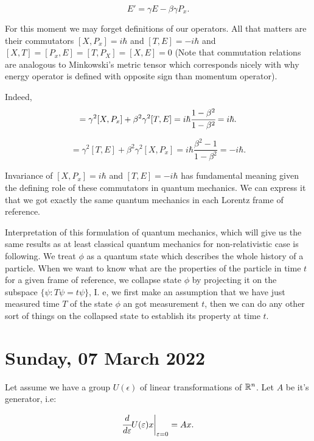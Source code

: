 \documentclass[main.tex]{subfiles}
\begin{document}
\begin{equation}
E' = \gamma E - \beta\gamma P_x.
\end{equation}

For this moment we may forget definitions of our operators. All that matters are their commutators $[X, P_x] = i\hbar$ and $[T, E] = -i\hbar$ and $[X, T] = [P_x, E] = [T, P_X] = [X, E] = 0$ (Note that commutation relations are analogous to Minkowski's metric tensor which corresponds nicely with why energy operator is defined with opposite sign than momentum operator).

Indeed,
\begin{equation}
[X', P'_x] = \gamma^2 [X, P_x] + \beta^2\gamma^2[T, E] = i\hbar\cfrac{1 - \beta^2}{1 - \beta^2} = i\hbar.
\end{equation}

\begin{equation}
[T', E'] = \gamma^2 [T, E] + \beta^2\gamma^2[X, P_x] = i\hbar \frac{\beta^2 - 1}{1 - \beta^2} = -i\hbar.
\end{equation}

Invariance of $[X, P_x] = i\hbar$ and $[T, E] = -i\hbar$ has fundamental meaning given the defining role of these commutators in quantum mechanics. We can express it that we got exactly the same quantum mechanics in each Lorentz frame of reference.

Interpretation of this formulation of quantum mechanics, which will give us the same results as at least classical quantum mechanics for non-relativistic case is following. We treat $\phi$ as a quantum state which describes the whole history of a particle. When we want to know what are the properties of the particle in time $t$ for a given frame of reference, we collapse state $\phi$ by projecting it on the subspace $\{\psi: T\psi = t\psi\}$, I. e, we first make an assumption that we have just measured time $T$ of the state $\phi$ an got measurement $t$, then we can do any other sort of things on the collapsed state to establish its property at time $t$.

\section{Sunday, 07 March 2022}

Let assume we have a group $U(\epsilon)$ of linear transformations of $\R^n$. Let $A$ be it's generator, i.e:

\begin{equation}
\cfrac{d}{d\epsilon} U(\epsilon)x \bigg|_{\epsilon=0} = A x.
\end{equation}
\end{document}
